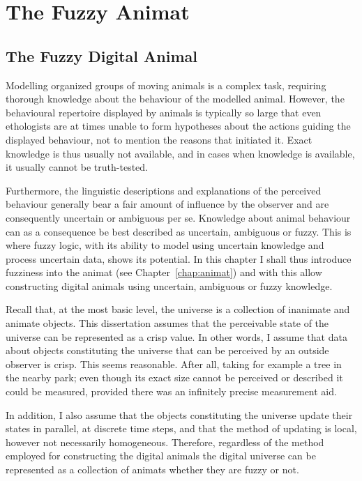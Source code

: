 \graphicspath{{img/}}




\chapter{The Fuzzy Animat}
\label{chap:fuzzyAnimat}


\section{The Fuzzy Digital Animal}
\label{sec:fuzzyAnimat}
Modelling organized groups of moving animals is a complex task, requiring thorough knowledge about the behaviour of the modelled animal. However, the behavioural repertoire displayed by animals is typically so large that even ethologists are at times unable to form hypotheses about the actions guiding the displayed behaviour, not to mention the reasons that initiated it. Exact knowledge is thus usually not available, and in cases when knowledge is available, it usually cannot be truth-tested. 

Furthermore, the linguistic descriptions and explanations of the perceived behaviour generally bear a fair amount of influence by the observer and are consequently uncertain or ambiguous per se. Knowledge about animal behaviour can as a consequence be best described as uncertain, ambiguous or fuzzy. This is where fuzzy logic, with its ability to model using uncertain knowledge and process uncertain data, shows its potential. In this chapter I shall thus introduce fuzziness into the animat (see Chapter~\ref{chap:animat}) and with this allow constructing digital animals using uncertain, ambiguous or fuzzy knowledge. 

Recall that, at the most basic level, the universe is a collection of inanimate and animate objects. This dissertation assumes that the perceivable state of the universe can be represented as a crisp value. In other words, I assume that data about objects constituting the universe that can be perceived by an outside observer is crisp. This seems reasonable. After all, taking for example a tree in the nearby park; even though its exact size cannot be perceived or described it could be measured, provided there was an infinitely precise measurement aid.

In addition, I also assume that the objects constituting the universe update their states in parallel, at discrete time steps, and that the method of updating is local, however not necessarily homogeneous. Therefore, regardless of the method employed for constructing the digital animals the digital universe can be represented as a collection of animats whether they are fuzzy or not.

